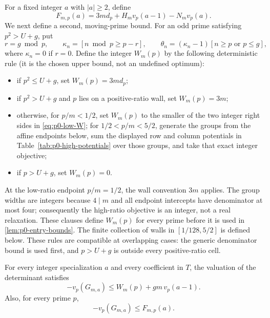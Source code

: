 For a fixed integer $a$ with $|a|\ge2$, define
\[
 F_{m,p}(a)=3m d_p+H_m v_p(a-1)-N_m v_p(a).
\]
We next define a second, moving-prime bound.  For an odd prime satisfying
$p^2>U+g$, put
\[
 r=g\bmod p,\qquad
 \kappa_n=[n\bmod p\ge p-r],\qquad
 \theta_n=(\kappa_n-1)[n\ge p\text{ or }p\le g],
\]
where $\kappa_n=0$ if $r=0$.  Define the integer $W_m(p)$ by the following
deterministic rule (it is the chosen upper bound, not an undefined optimum):
\begin{itemize}
\item if $p^2\le U+g$, set $W_m(p)=3m d_p$;
\item if $p^2>U+g$ and $p$ lies on a positive-ratio wall, set $W_m(p)=3m$;
\item otherwise, for $p/m<1/2$, set $W_m(p)$ to the smaller of the two
  integer right sides in \eqref{eq:p0-low-W}; for
  $1/2<p/m<5/2$, generate the groups from the affine endpoints below,
  sum the displayed row and column potentials in Table~\ref{tab:p0-high-potentials}
  over those groups, and take that exact integer objective;
\item if $p>U+g$, set $W_m(p)=0$.
\end{itemize}
At the low-ratio endpoint $p/m=1/2$, the wall convention $3m$ applies.
The group widths are integers because $4\mid m$ and all endpoint intercepts
have denominator at most four; consequently the high-ratio objective is an
integer, not a real relaxation.  These clauses define $W_m(p)$ for every
prime before it is used in \ref{lem:p0-entry-bounds}.
The finite collection of walls in $[1/128,5/2]$ is defined below.  These
rules are compatible at overlapping cases: the generic denominator bound is
used first, and $p>U+g$ is outside every positive-ratio cell.

\begin{lemma}\label{lem:p0-entry-bounds}
For every integer specialization $a$ and every coefficient in $T$, the
valuation of the determinant satisfies
\[
 -v_p(G_{m,a})\le W_m(p)+gm\,v_p(a-1).
\]
Also, for every prime $p$,
\[
 -v_p(G_{m,a})\le F_{m,p}(a).
\]
\end{lemma}


